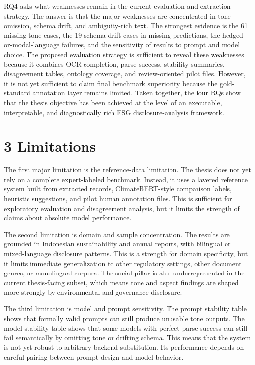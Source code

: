RQ4 asks what weaknesses remain in the current evaluation and extraction strategy. The answer is that the major weaknesses are concentrated in tone omission, schema drift, and ambiguity-rich text. The strongest evidence is the 61 missing-tone cases, the 19 schema-drift cases in missing predictions, the hedged-or-modal-language failures, and the sensitivity of results to prompt and model choice. The proposed evaluation strategy is sufficient to reveal these weaknesses because it combines OCR completion, parse success, stability summaries, disagreement tables, ontology coverage, and review-oriented pilot files. However, it is not yet sufficient to claim final benchmark superiority because the gold-standard annotation layer remains limited. Taken together, the four RQs show that the thesis objective has been achieved at the level of an executable, interpretable, and diagnostically rich ESG disclosure-analysis framework.
\section{3 Limitations}

The first major limitation is the reference-data limitation. The thesis does not yet rely on a complete expert-labeled benchmark. Instead, it uses a layered reference system built from extracted records, ClimateBERT-style comparison labels, heuristic suggestions, and pilot human annotation files. This is sufficient for exploratory evaluation and disagreement analysis, but it limits the strength of claims about absolute model performance.

The second limitation is domain and sample concentration. The results are grounded in Indonesian sustainability and annual reports, with bilingual or mixed-language disclosure patterns. This is a strength for domain specificity, but it limits immediate generalization to other regulatory settings, other document genres, or monolingual corpora. The social pillar is also underrepresented in the current thesis-facing subset, which means tone and aspect findings are shaped more strongly by environmental and governance disclosure.

The third limitation is model and prompt sensitivity. The prompt stability table shows that formally valid prompts can still produce unusable tone outputs. The model stability table shows that some models with perfect parse success can still fail semantically by omitting tone or drifting schema. This means that the system is not yet robust to arbitrary backend substitution. Its performance depends on careful pairing between prompt design and model behavior.

